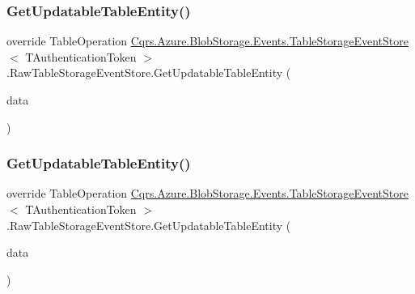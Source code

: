 \subsubsection{\texorpdfstring{Get\+Updatable\+Table\+Entity()}{GetUpdatableTableEntity()}\hspace{0.1cm}{\footnotesize\ttfamily [1/2]}}
{\footnotesize\ttfamily override Table\+Operation \hyperlink{classCqrs_1_1Azure_1_1BlobStorage_1_1Events_1_1TableStorageEventStore}{Cqrs.\+Azure.\+Blob\+Storage.\+Events.\+Table\+Storage\+Event\+Store}$<$ T\+Authentication\+Token $>$.Raw\+Table\+Storage\+Event\+Store.\+Get\+Updatable\+Table\+Entity (\begin{DoxyParamCaption}\item[{\hyperlink{classCqrs_1_1Events_1_1EventData}{Event\+Data}}]{data }\end{DoxyParamCaption})\hspace{0.3cm}{\ttfamily [protected]}}

\mbox{\label{classCqrs_1_1Azure_1_1BlobStorage_1_1Events_1_1TableStorageEventStore_1_1RawTableStorageEventStore_a36cc2b354b0e2dc33a032473e459c8ec_a36cc2b354b0e2dc33a032473e459c8ec}} 
\subsubsection{\texorpdfstring{Get\+Updatable\+Table\+Entity()}{GetUpdatableTableEntity()}\hspace{0.1cm}{\footnotesize\ttfamily [2/2]}}
{\footnotesize\ttfamily override Table\+Operation \hyperlink{classCqrs_1_1Azure_1_1BlobStorage_1_1Events_1_1TableStorageEventStore}{Cqrs.\+Azure.\+Blob\+Storage.\+Events.\+Table\+Storage\+Event\+Store}$<$ T\+Authentication\+Token $>$.Raw\+Table\+Storage\+Event\+Store.\+Get\+Updatable\+Table\+Entity (\begin{DoxyParamCaption}\item[{\hyperlink{classCqrs_1_1Azure_1_1BlobStorage_1_1EventDataTableEntity}{Event\+Data\+Table\+Entity}$<$ \hyperlink{classCqrs_1_1Events_1_1EventData}{Event\+Data} $>$}]{data }\end{DoxyParamCaption})\hspace{0.3cm}{\ttfamily [protected]}}


